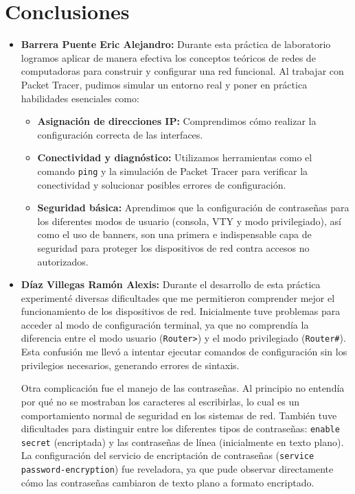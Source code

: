 \documentclass[a4paper,11pt]{article}
\begin{document}
\section{Conclusiones}
\begin{itemize}
    \item \textbf{Barrera Puente Eric Alejandro:}
          Durante esta práctica de laboratorio logramos aplicar de manera efectiva los conceptos teóricos de redes de computadoras para construir y configurar una red funcional. Al trabajar con Packet Tracer, pudimos simular un entorno real y poner en práctica habilidades esenciales como:
          \begin{itemize}
              \item \textbf{Asignación de direcciones IP:} Comprendimos cómo realizar la configuración correcta de las interfaces.
              \item \textbf{Conectividad y diagnóstico:} Utilizamos herramientas como el comando \texttt{ping} y la simulación de Packet Tracer para verificar la conectividad y solucionar posibles errores de configuración.
              \item \textbf{Seguridad básica:} Aprendimos que la configuración de contraseñas para los diferentes modos de usuario (consola, VTY y modo privilegiado), así como el uso de banners, son una primera e indispensable capa de seguridad para proteger los dispositivos de red contra accesos no autorizados.
          \end{itemize}

    \item \textbf{Díaz Villegas Ramón Alexis:}
          Durante el desarrollo de esta práctica experimenté diversas dificultades que me permitieron comprender mejor el funcionamiento de los dispositivos de red. Inicialmente tuve problemas para acceder al modo de configuración terminal, ya que no comprendía la diferencia entre el modo usuario (\texttt{Router>}) y el modo privilegiado (\texttt{Router\#}). Esta confusión me llevó a intentar ejecutar comandos de configuración sin los privilegios necesarios, generando errores de sintaxis.

          Otra complicación fue el manejo de las contraseñas. Al principio no entendía
          por qué no se mostraban los caracteres al escribirlas, lo cual es un
          comportamiento normal de seguridad en los sistemas de red. También tuve
          dificultades para distinguir entre los diferentes tipos de contraseñas:
          \texttt{enable secret} (encriptada) y las contraseñas de línea (inicialmente en
          texto plano). La configuración del servicio de encriptación de contraseñas
          (\texttt{service password-encryption}) fue reveladora, ya que pude observar
          directamente cómo las contraseñas cambiaron de texto plano a formato
          encriptado.


\end{itemize}
\end{document}
